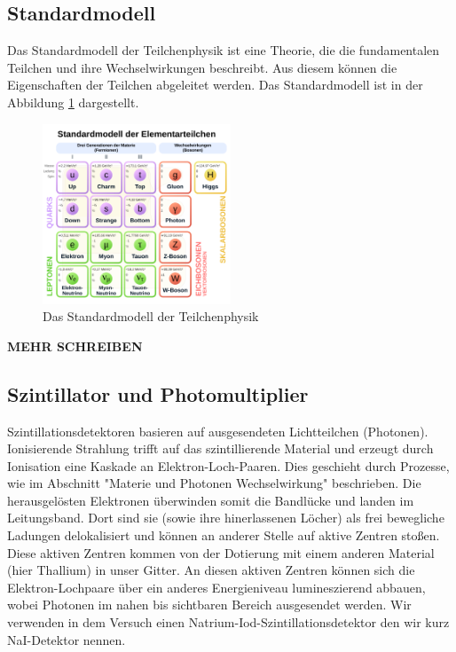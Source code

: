 \documentclass{article}
\begin{document}
\subsection{Standardmodell}
Das Standardmodell der Teilchenphysik ist eine Theorie, die die fundamentalen Teilchen und ihre Wechselwirkungen beschreibt.
Aus diesem können die Eigenschaften der Teilchen abgeleitet werden. Das Standardmodell ist in der Abbildung \ref{fig:Standardmodell} dargestellt.
\begin{figure}[H]
    \centering
    \includegraphics[width=0.5\textwidth]{figures/Standardmodell.png}
    \caption{Das Standardmodell der Teilchenphysik \cite{Standardmodell}}
    \label{fig:Standardmodell} 
\end{figure}
\textbf{\color{red}MEHR SCHREIBEN}

\subsection{Szintillator und Photomultiplier}
Szintillationsdetektoren basieren auf ausgesendeten Lichtteilchen (Photonen). Ionisierende Strahlung trifft auf das szintillierende Material und erzeugt durch Ionisation eine Kaskade an Elektron-Loch-Paaren. Dies geschieht durch Prozesse, wie im Abschnitt "Materie und Photonen Wechselwirkung" beschrieben. Die herausgelösten Elektronen überwinden somit die Bandlücke und landen im Leitungsband. Dort sind sie (sowie ihre hinerlassenen Löcher) als frei bewegliche Ladungen delokalisiert und können an anderer Stelle auf aktive Zentren stoßen. Diese aktiven Zentren kommen von der Dotierung mit einem anderen Material (hier Thallium) in unser Gitter. An diesen aktiven Zentren können sich die Elektron-Lochpaare über ein anderes Energieniveau lumineszierend abbauen, wobei Photonen im nahen bis sichtbaren Bereich ausgesendet werden. Wir verwenden in dem Versuch einen Natrium-Iod-Szintillationsdetektor den wir kurz NaI-Detektor nennen.
\end{document}
